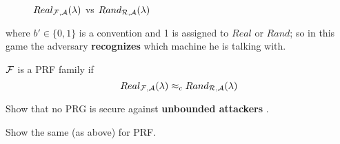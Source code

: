 \begin{figure}[!h]
   \sdinit{}
   \sdinit{}
   \caption{$Real_{\mathcal{F}, \mathcal{A}}(\lambda)$ vs $Rand_{\mathcal{R}, \mathcal{A}}(\lambda) $}
\end{figure}

where $b' \in \{0,1\}$ is a convention and 1 is assigned to $Real$ or $Rand$; so
in this game the adversary \textbf{recognizes}  which machine he is talking with.

\begin{definition}
    $\mathcal{F}$ is a PRF family if 
    \[
        Real_{\mathcal{F}, \mathcal{A}}(\lambda) \approx_{c} Rand_{\mathcal{R}, \mathcal{A}}(\lambda)
    \]
\end{definition}

\begin{exercise}
    Show that no PRG is secure against \textbf{unbounded attackers} .
\end{exercise}

\begin{exercise}
    Show the same (as above) for PRF.
\end{exercise}

